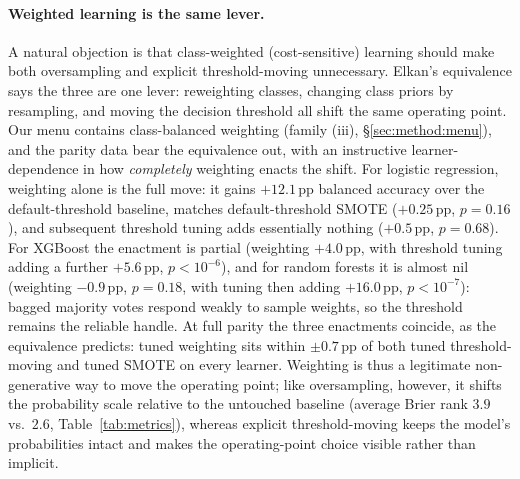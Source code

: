 \paragraph{Weighted learning is the same lever.} A natural objection is that
class-weighted (cost-sensitive) learning should make both oversampling and
explicit threshold-moving unnecessary. Elkan's equivalence
\cite{elkan2001foundations} says the three are one lever: reweighting classes,
changing class priors by resampling, and moving the decision threshold all shift
the same operating point. Our menu contains class-balanced weighting (family
(iii), \S\ref{sec:method:menu}), and the parity data bear the equivalence out,
with an instructive learner-dependence in how \emph{completely} weighting enacts
the shift. For logistic regression, weighting alone is the full move: it gains
$+12.1$\,pp balanced accuracy over the default-threshold baseline, matches
default-threshold SMOTE ($+0.25$\,pp, $p{=}0.16$), and subsequent threshold
tuning adds essentially nothing ($+0.5$\,pp, $p{=}0.68$). For XGBoost the
enactment is partial (weighting $+4.0$\,pp, with threshold tuning adding a
further $+5.6$\,pp, $p{<}10^{-6}$), and for random forests it is almost nil
(weighting $-0.9$\,pp, $p{=}0.18$, with tuning then adding $+16.0$\,pp,
$p{<}10^{-7}$): bagged majority votes respond weakly to sample weights, so the
threshold remains the reliable handle. At full parity the three enactments
coincide, as the equivalence predicts: tuned weighting sits within
$\pm0.7$\,pp of both tuned threshold-moving and tuned SMOTE on every learner.
Weighting is thus a legitimate non-generative way to move the operating point;
like oversampling, however, it shifts the probability scale relative to the
untouched baseline (average Brier rank $3.9$ vs.\ $2.6$, Table~\ref{tab:metrics}),
whereas explicit threshold-moving keeps the model's probabilities intact and makes
the operating-point choice visible rather than implicit.

\begin{table}[t]
\centering
\caption{Probability metrics by strategy (XGBoost, mean over the 27 KEEL binary
datasets, out-of-fold). Oversampling does not improve ranking (ROC-AUC, PR-AUC at
fixed prevalence) and recall at $10\%$ false-positive rate is unimproved. The
calibration verdict is metric-relative: the unresampled baseline is best on the
classical, prevalence-weighted Brier/ECE, while the oversampled models are best
on their class-balanced versions --- two views of the same prior shift
(\S\ref{sec:results:frontier}). The two rank rows are mean per-dataset ranks
across the seven strategies (lower is better).}
\label{tab:metrics}
\footnotesize

\end{table}

